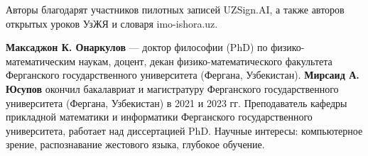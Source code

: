 \documentclass[a4paper,fleqn]{cas-dc}
\begin{document}
Авторы благодарят участников пилотных записей UZSign.AI, а также авторов открытых уроков УзЖЯ и словаря imo-ishora.uz.



\bio{}
\textbf{Максаджон К. Онаркулов} — доктор философии (PhD) по физико-математическим наукам, доцент, декан физико-математического факультета Ферганского государственного университета (Фергана, Узбекистан).
\endbio
\bio{}
\textbf{Мирсаид А. Юсупов} окончил бакалавриат и магистратуру Ферганского государственного университета (Фергана, Узбекистан) в 2021 и 2023 гг. Преподаватель кафедры прикладной математики и информатики Ферганского государственного университета, работает над диссертацией PhD. Научные интересы: компьютерное зрение, распознавание жестового языка, глубокое обучение.
\endbio
\end{document}
